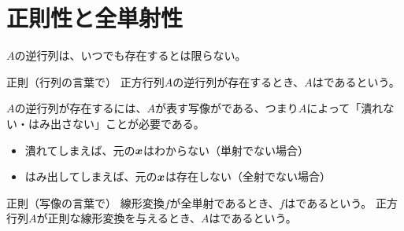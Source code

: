 \documentclass[../../../topic_linear-algebra]{subfiles}
\begin{document}
\sectionline
\section{正則性と全単射性}

$A$の逆行列は、いつでも存在するとは限らない。

\begin{definition}{正則（行列の言葉で）}
  正方行列$A$の逆行列が存在するとき、$A$はであるという。
\end{definition}

\br

$A$の逆行列が存在するには、$A$が表す写像がである、つまり$A$によって「潰れない・はみ出さない」ことが必要である。

\begin{itemize}
  \item 潰れてしまえば、元の$\vb*{x}$はわからない（単射でない場合）
  \item はみ出してしまえば、元の$\vb*{x}$は存在しない（全射でない場合）
\end{itemize}

\begin{definition}{正則（写像の言葉で）}
  線形変換$f$が全単射であるとき、$f$はであるという。
  正方行列$A$が正則な線形変換を与えるとき、$A$はであるという。
\end{definition}
\end{document}
